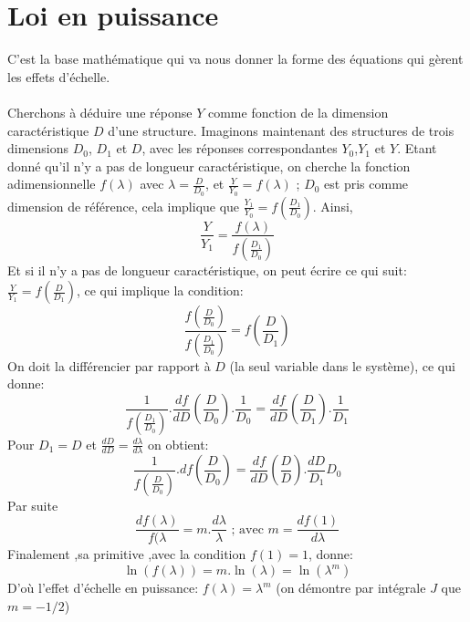 \documentclass[12pt]{report}
\begin{document}
\section{Loi en puissance}
C'est la base mathématique qui va nous donner la forme des équations qui gèrent les effets d'échelle.\\\\   
Cherchons à déduire une réponse $Y$ comme fonction de la dimension
caractéristique $D$ d'une structure. Imaginons maintenant des structures de trois dimensions $D_0$, $D_1$ et $D$, avec les réponses correspondantes $Y_0$,$Y_1$ et $Y$. Etant donné qu'il n'y a pas de longueur
caractéristique, on cherche la fonction adimensionnelle $f(\lambda)$ avec $\lambda = \frac{D}{D_0}$, et $\frac{Y}{Y_0} = f(\lambda)$ ; $D_0$ est pris comme dimension de référence, cela implique que $\frac{Y_1}{Y_0} = f(\frac{D_1}{D_0})$.
Ainsi, \[\frac{Y}{Y_1} = \frac{f(\lambda)}{f(\frac{D_1}{D_0})}\]
Et si il n'y a pas de longueur caractéristique, on peut écrire ce qui suit: $\frac{Y}{Y_1} = f(\frac{D}{D_1})$, ce qui implique la condition:
\[\frac{f(\frac{D}{D_0})}{f(\frac{D_1}{D_0})} = f(\frac{D}{D_1})\]
On doit la différencier par rapport à $D$ (la seul variable dans le système), ce qui donne:\[\frac{1}{f(\frac{D_1}{D_0})}.\frac{df}{dD}(\frac{D}{D_0}).\frac{1}{D_0} = \frac{df}{dD}(\frac{D}{D_1}).\frac{1}{D_1}\]
Pour $D_1 = D$ et $\frac{dD}{dD} = \frac{d\lambda}{d\lambda}$ on obtient:
\[\frac{1}{f(\frac{D}{D_0})}.df(\frac{D}{D_0}) = \frac{df}{dD}(\frac{D}{D}).\frac{dD}{D_1}D_0\]
Par suite \[\frac{df(\lambda)}{f(\lambda} = m.\frac{d\lambda}{\lambda}\text{  ; avec  }m = \frac{df(1)}{d\lambda}\]
Finalement ,sa primitive ,avec la condition $f(1) = 1$, donne: \[\ln(f(\lambda)) = m.\ln(\lambda) = \ln(\lambda^m)\]
D'où l'effet d'échelle en puissance: $f(\lambda) = \lambda^m$ (on démontre par intégrale $J$ que $m = -1/2$)
\end{document}
